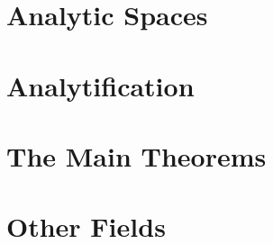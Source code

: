 \documentclass[12pt]{article}
\begin{document}
\section{Analytic Spaces}

\section{Analytification}

\section{The Main Theorems}

\section{Other Fields}
\end{document}
